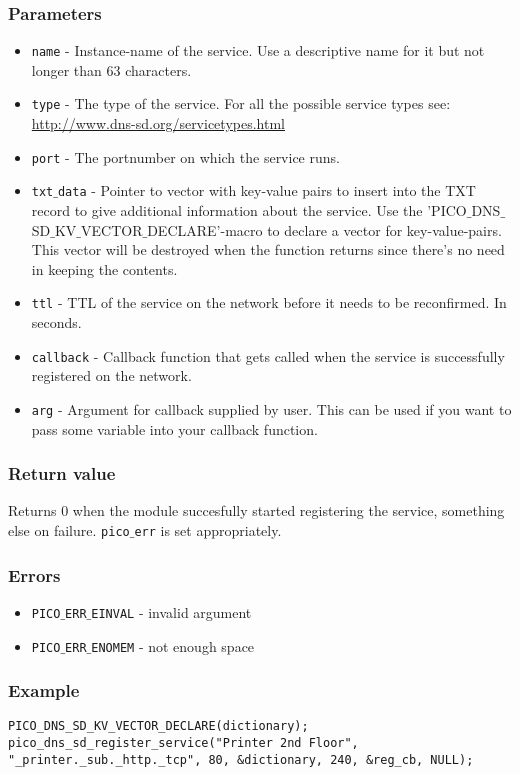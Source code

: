 \subsubsection*{Parameters}
\begin{itemize}[noitemsep]
\item \texttt{name} - Instance-name of the service. Use a descriptive name for it but not longer than 63 characters.
\item \texttt{type} - The type of the service. For all the possible service types see: \url{http://www.dns-sd.org/servicetypes.html}
\item \texttt{port} - The portnumber on which the service runs.
\item \texttt{txt$\_$data} - Pointer to vector with key-value pairs to insert into the TXT record to give additional information about the service. Use the 'PICO$\_$DNS$\_$SD$\_$KV$\_$VECTOR$\_$DECLARE'-macro to declare a vector for key-value-pairs. This vector will be destroyed when the function returns since there's no need in keeping the contents.
\item \texttt{ttl} - TTL of the service on the network before it needs to be reconfirmed. In seconds.
\item \texttt{callback} - Callback function that gets called when the service is successfully registered on the network.
\item \texttt{arg} -  Argument for callback supplied by user. This can be used if you want to pass some variable into your callback function.
\end{itemize}

\subsubsection*{Return value}
Returns 0 when the module succesfully started registering the service, something else on failure. \texttt{pico$\_$err} is set appropriately.

\subsubsection*{Errors}
\begin{itemize}[noitemsep]
\item \texttt{PICO$\_$ERR$\_$EINVAL} - invalid argument
\item \texttt{PICO$\_$ERR$\_$ENOMEM} - not enough space
\end{itemize}

\subsubsection*{Example}
\begin{verbatim}
PICO_DNS_SD_KV_VECTOR_DECLARE(dictionary);
pico_dns_sd_register_service("Printer 2nd Floor", "_printer._sub._http._tcp", 80, &dictionary, 240, &reg_cb, NULL);
\end{verbatim}


